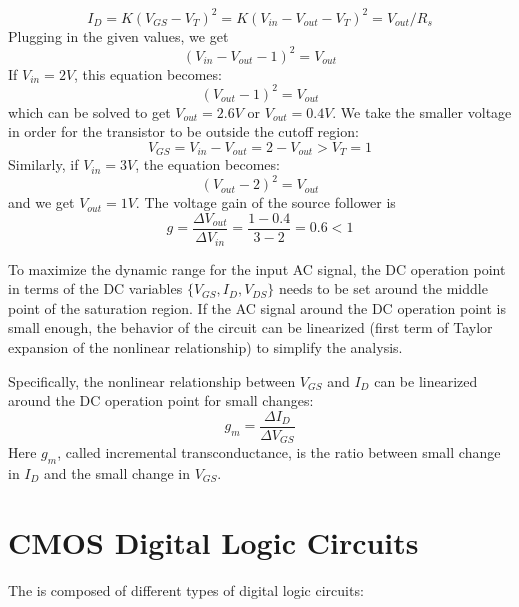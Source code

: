 \documentclass{article}
\begin{document}
\begin{equation} I_D=K(V_{GS}-V_T)^2=K(V_{in}-V_{out}-V_T)^2=V_{out}/R_s \end{equation}
Plugging in the given values, we get
\begin{equation} (V_{in}-V_{out}-1)^2=V_{out} \end{equation}
If $V_{in}=2V$, this equation becomes:
\begin{equation} (V_{out}-1)^2=V_{out} \end{equation}
which can be solved to get $V_{out}=2.6V$ or $V_{out}=0.4V$. We take the smaller 
voltage in order for the transistor to be outside the cutoff region:
\begin{equation} V_{GS}=V_{in}-V_{out}=2-V_{out}>V_T=1 \end{equation}
Similarly, if $V_{in}=3V$, the equation becomes:
\begin{equation} (V_{out}-2)^2=V_{out} \end{equation}
and we get $V_{out}=1V$. The voltage gain of the source follower is 
\begin{equation} g=\frac{\Delta V_{out}}{\Delta V_{in}}=\frac{1-0.4}{3-2}=0.6<1 \end{equation}

To maximize the dynamic range for the input AC signal, the DC operation point
in terms of the DC variables $\{V_{GS}, I_D, V_{DS}\}$ needs to be set around
the middle point of the saturation region. If the AC signal around the DC 
operation point is small enough, the behavior of the circuit can be linearized
(first term of Taylor expansion of the nonlinear relationship) to simplify the
analysis. 


Specifically, the nonlinear relationship between $V_{GS}$ and $I_D$ can 
be linearized around the DC operation point for small changes:
\begin{equation} g_m=\frac{\Delta I_D}{\Delta V_{GS}} \end{equation}
Here $g_m$, called incremental transconductance, is the ratio between small 
change in $I_D$ and the small change in $V_{GS}$.

\section{CMOS Digital Logic Circuits}

The 
is composed of different types of digital logic circuits:
\end{document}
